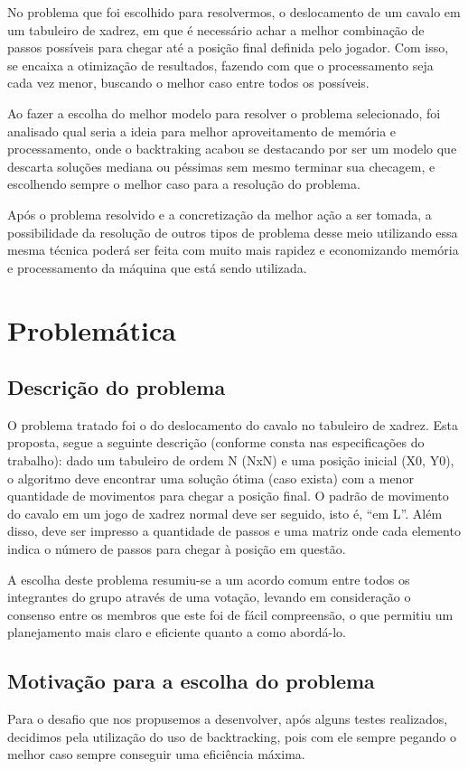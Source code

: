 \documentclass[relatorio]{IEEEtran}
\begin{document}
No problema que foi escolhido para resolvermos, o deslocamento de um cavalo em um tabuleiro de xadrez, em que é necessário achar a melhor combinação de passos possíveis para chegar até a posição final definida pelo jogador. Com isso, se encaixa a otimização de resultados, fazendo com que o processamento seja cada vez menor, buscando o melhor caso entre todos os possíveis.

Ao fazer a escolha do melhor modelo para resolver o problema selecionado, foi analisado qual seria a ideia para melhor aproveitamento de memória e processamento, onde o backtraking acabou se destacando por ser um modelo que descarta soluções mediana ou péssimas sem mesmo terminar sua checagem, e escolhendo sempre o melhor caso para a resolução do problema.

Após o problema resolvido e a concretização da melhor ação a ser tomada, a possibilidade da resolução de outros tipos de problema desse meio utilizando essa mesma técnica poderá ser feita com muito mais rapidez e economizando memória e processamento da máquina que está sendo utilizada.

\section{Problemática}

\subsection{Descrição do problema}
O problema tratado foi o do deslocamento do cavalo no tabuleiro de xadrez. Esta proposta, segue a seguinte descrição (conforme consta nas especificações do trabalho): dado um tabuleiro de ordem N (NxN) e uma posição inicial (X0, Y0), o algoritmo deve encontrar uma solução ótima (caso exista) com a menor quantidade de movimentos para chegar a posição final. O padrão de movimento do cavalo em um jogo de xadrez normal deve ser seguido, isto é, “em L”. Além disso, deve ser impresso a quantidade de passos e uma matriz onde cada elemento indica o número de passos para chegar à posição em questão.

A escolha deste problema resumiu-se a um acordo comum entre todos os integrantes do grupo através de uma votação, levando em consideração o consenso entre os membros que este foi de fácil compreensão, o que permitiu um planejamento mais claro e eficiente quanto a como abordá-lo.

\subsection{Motivação para a escolha do problema}
Para o desafio que nos propusemos a desenvolver, após alguns testes realizados, decidimos pela utilização do uso de backtracking, pois com ele sempre pegando o melhor caso sempre conseguir uma eficiência máxima.
\end{document}
